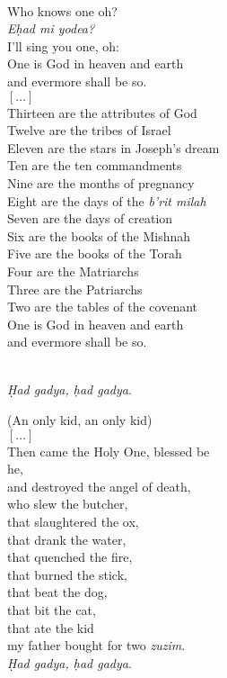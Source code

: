 \documentclass[a4paper,12pt,openany]{memoir}
\newcommand{\HgEllipsis}{\ensuremath{\left[\ldots\right]}}
\newenvironment{HgEnglish}{\strut\\\noindent}{\vspace{1em}}
\begin{document}
\noindent
\begin{minipage}{.45\textwidth}
\begin{HgEnglish}
Who knows one oh? \\
{\itshape E\d{h}ad mi yodea?} \\
I'll sing you one, oh: \\
One is God in heaven and earth \\
and evermore shall be so. \\
\HgEllipsis \\
Thirteen are the attributes of God \\
Twelve are the tribes of Israel \\
Eleven are the stars in Joseph's dream \\
Ten are the ten commandments \\
Nine are the months of pregnancy \\
Eight are the days of the {\itshape b'rit milah} \\
Seven are the days of creation \\
Six are the books of the Mishnah \\
Five are the books of the Torah \\
Four are the Matriarchs \\
Three are the Patriarchs \\
Two are the tables of the covenant \\
One is God in heaven and earth \\
and evermore shall be so.
\end{HgEnglish}
\end{minipage}
\hfill
\begin{minipage}{.45\textwidth}
\begin{HgEnglish}
{\itshape \d{H}ad gadya, \d{h}ad gadya}. \\
\strut \hfill (An only kid, an only kid) \\
\HgEllipsis \\
Then came the Holy One, blessed be \\
\vin he, \\
and destroyed the angel of death, \\
who slew the butcher, \\
that slaughtered the ox, \\
that drank the water, \\
that quenched the fire, \\
that burned the stick, \\
that beat the dog, \\
that bit the cat, \\
that ate the kid \\
my father bought for two {\itshape zuzim}. \\
{\itshape \d{H}ad gadya, \d{h}ad gadya}.
\end{HgEnglish}
\end{minipage}
\end{document}
